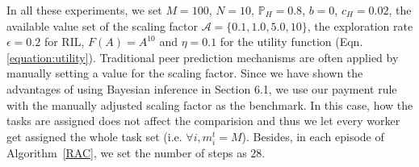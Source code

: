 In all these experiments, we set $M=100$, $N=10$, $\mathbb{P}_H=0.8$, $b=0$, $c_H=0.02$, the available value set of the scaling factor $\mathcal{A}=\{0.1,1.0,5.0,10\}$, the exploration rate $\epsilon = 0.2$ for RIL, $F(A)=A^{10}$ and $\eta=0.1$ for the utility function (Eqn.\ref{equation:utility}).
Traditional peer prediction mechanisms are often applied by manually setting a value for the scaling factor.
Since we have shown the advantages of using Bayesian inference in Section 6.1, we use our payment rule with the manually adjusted scaling factor as the benchmark. 
In this case, how the tasks are assigned does not affect the comparision and thus we let every worker get assigned the whole task set (i.e. $\forall i, m_i^t = M$).
Besides, in each episode of Algorithm~\ref{RAC}, we set the number of steps as $28$.

%
%
 

